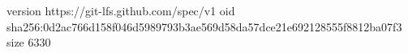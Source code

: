 version https://git-lfs.github.com/spec/v1
oid sha256:0d2ac766d158f046d5989793b3ae569d58da57dce21e692128555f8812ba07f3
size 6330
